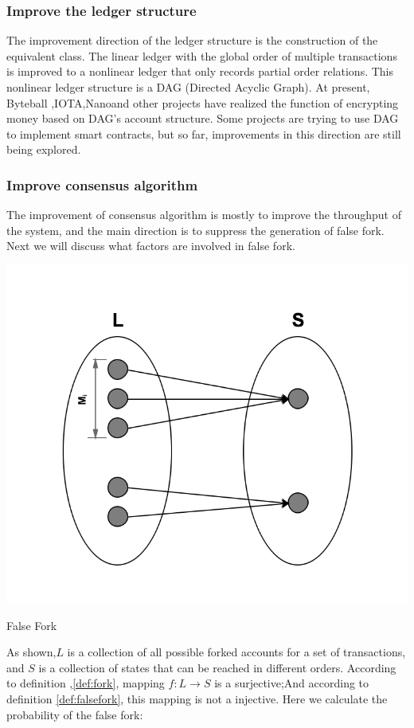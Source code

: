 \documentclass[UTF8,nofonts]{article}
\makeatletter
\newenvironment{figurehere}
 {\def\@captype{figure}}
 {}
\makeatother
\begin{document}
\begin{multicols}{2}
\subsubsection{Improve the ledger structure}
The improvement direction of the ledger structure is the construction of the equivalent class. The linear ledger with the global order of multiple transactions is improved to a nonlinear ledger that only records partial order relations. This nonlinear ledger structure is a DAG (Directed Acyclic Graph). At present, Byteball \cite{byteball},IOTA\cite{iota},Nano\cite{nano}and other projects have realized the function of encrypting money based on DAG's account structure. Some projects are trying to use DAG to implement smart contracts, but so far, improvements in this direction are still being explored.

\subsubsection{Improve consensus algorithm}
The improvement of consensus algorithm is mostly to improve the throughput of the system, and the main direction is to suppress the generation of false fork. Next we will discuss what factors are involved in false fork.

\begin{center}
\begin{figurehere}
\includegraphics[width=.7\linewidth]{image/falsefork.png}
\caption{ False Fork}
\end{figurehere}
\end{center}

As shown,$L$  is a collection of all possible forked accounts for a set of transactions, and $S$ is a collection of states that can be reached in different orders. According to definition ,\ref{def:fork}, mapping $f: L \rightarrow S$  is a surjective;And according to definition \ref{def:falsefork}, this mapping is not a injective. Here we calculate the probability of the false fork:


\end{multicols}
\end{document}
